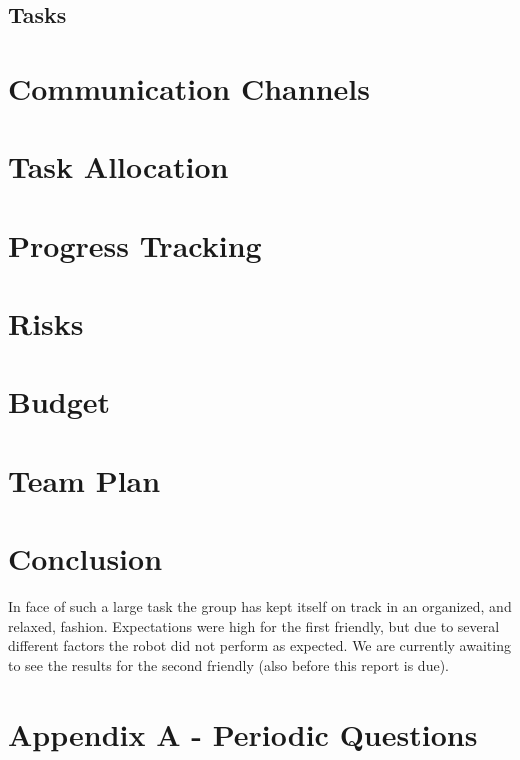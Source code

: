 \documentclass[a4paper,12pt]{article}
\begin{document}
\subsection{Tasks}


\section{Communication Channels}


\section{Task Allocation}


\section{Progress Tracking}


\section{Risks}

\section{Budget}

\section{Team Plan}


\section{Conclusion}
In face of such a large task the group has kept itself on track in an organized, and relaxed, fashion. Expectations were high for the first friendly, but due to several different factors the robot did not perform as expected. We are currently awaiting to see the results for the second friendly (also before this report is due).

\newpage
\section*{Appendix A - Periodic Questions}
\begin{figure}[H]
    \centering
    
    \label{fig:andralog}
\end{figure}
\newpage
\end{document}
